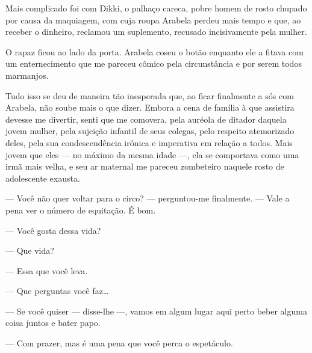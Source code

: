 Mais complicado foi com Dikki, o palhaço careca, pobre homem de rosto
chupado por causa da maquiagem, com cuja roupa Arabela perdeu mais tempo
e que, ao receber o dinheiro, reclamou um suplemento, recusado
incisivamente pela mulher.


O rapaz ficou ao lado da porta. Arabela coseu o botão enquanto ele a
fitava com um enternecimento que me pareceu cômico pela circunstância e
por serem todos marmanjos.

Tudo isso se deu de maneira tão inesperada que, ao ficar finalmente a
sós com Arabela, não soube mais o que dizer. Embora a cena de família à
que assistira devesse me divertir, senti que me comovera, pela auréola
de ditador daquela jovem mulher, pela sujeição infantil de seus colegas,
pelo respeito atemorizado deles, pela sua condescendência irônica e
imperativa em relação a todos. Mais jovem que eles --- no máximo da
mesma idade ---, ela se comportava como uma irmã mais velha, e seu ar
maternal me pareceu zombeteiro naquele rosto de adolescente exausta.

--- Você não quer voltar para o circo? --- perguntou-me finalmente. ---
Vale a pena ver o número de equitação. É bom.


--- Você gosta dessa vida?

--- Que vida?

--- Essa que você leva.

--- Que perguntas você faz\ldots{}


--- Se você quiser --- disse-lhe ---, vamos em algum lugar aqui perto
beber alguma coisa juntos e bater papo.

--- Com prazer, mas é uma pena que você perca o espetáculo.

